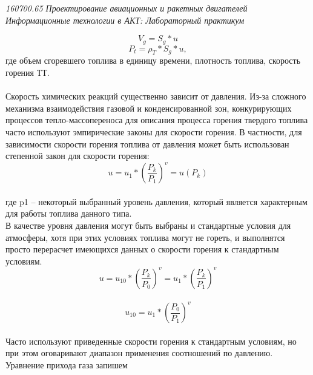 \documentclass{article}
\begin{document}
\begin{flushright}
\begin{scriptsize}
\textit{160700.65   Проектирование авиационных и ракетных двигателей\\
 Информационные технологии в АКТ: Лабораторный практикум} \\
\end{scriptsize}
\end{flushright}
\begin{equation}\label{eq:fourierrow} 
V_g = S_g * u 
\end{equation}
\begin{equation}\label{eq:fourierrow} 
P_t = \rho_T * S_g * u,
\end{equation}
где объем сгоревшего топлива в единицу времени, плотность топлива, скорость горения ТТ.\\
~\\
Скорость химических реакций существенно зависит от давления. Из-за сложного механизма взаимодействия газовой и конденсированной зон, конкурирующих процессов тепло-массопереноса для описания процесса горения твердого топлива часто используют эмпирические законы для скорости горения. В частности, для зависимости скорости горения топлива от давления может быть использован степенной закон для скорости горения:\\
\begin{equation}\label{eq:fourierrow} 
u = u_1 * {(\frac{P_k}{P_1})}^v = u(P_k)
\end{equation}\\
где p1 – некоторый выбранный уровень давления, который является характерным для работы топлива данного типа.\\
В качестве уровня давления могут быть выбраны и стандартные условия для атмосферы, хотя при этих условиях топлива могут не гореть, и выполнятся просто перерасчет имеющихся данных о скорости горения к стандартным условиям. \\
\begin{equation}\label{eq:fourierrow} 
u = u_{10} * {(\frac{P_k}{P_0})}^v = u_1 * {(\frac{P_k}{P_1})}^v
\end{equation}\\
\begin{equation}\label{eq:fourierrow} 
u_{10} = u_1 * {(\frac{P_0}{P_1})}^v
\end{equation}\\
Часто используют приведенные скорости горения к стандартным условиям, но при этом оговаривают диапазон применения соотношений по давлению. Уравнение прихода газа запишем \\
\end{document}
